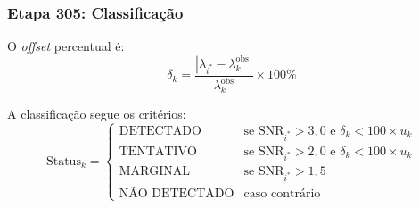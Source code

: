 \documentclass[12pt,a4paper]{article}
\begin{document}
\subsubsection{Etapa 305: Classificação}

O \textit{offset} percentual é:
\begin{equation}
\delta_k = \frac{|\lambda_{i^*} - \lambda_k^{\text{obs}}|}
  {\lambda_k^{\text{obs}}} \times 100\%
\label{eq:offset}
\end{equation}

A classificação segue os critérios:
\begin{equation}
\text{Status}_k = \begin{cases}
\text{DETECTADO} & \text{se } \text{SNR}_{i^*} > 3{,}0
  \text{ e } \delta_k < 100 \times u_k \\
\text{TENTATIVO} & \text{se } \text{SNR}_{i^*} > 2{,}0
  \text{ e } \delta_k < 100 \times u_k \\
\text{MARGINAL} & \text{se } \text{SNR}_{i^*} > 1{,}5 \\
\text{NÃO DETECTADO} & \text{caso contrário}
\end{cases}
\label{eq:classificacao}
\end{equation}
\end{document}
